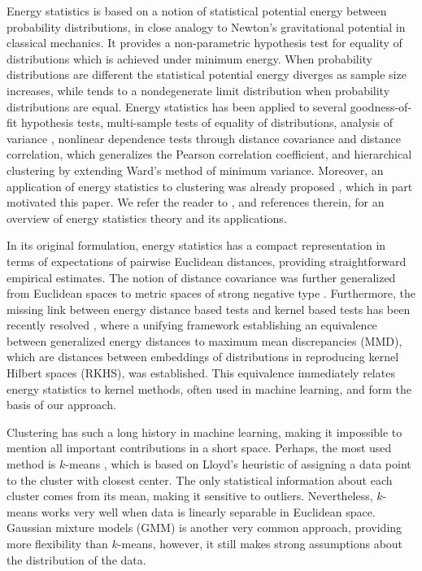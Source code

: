 \documentclass[aps,preprint,nofootinbib,floatfix]{revtex4-1}
\begin{document}
Energy statistics \cite{Szkely2013}
is based on a 
notion of statistical potential energy between probability distributions,
in close analogy to Newton's gravitational potential in classical mechanics. 
It provides a non-parametric hypothesis test for equality of 
distributions which is achieved 
under minimum energy. When probability distributions are different the 
statistical potential energy diverges as sample size increases, while tends 
to a nondegenerate limit distribution when probability
distributions are equal. 
Energy statistics has been applied to several goodness-of-fit 
hypothesis tests, multi-sample tests of equality of distributions, 
analysis of variance \cite{RizzoVariance}, nonlinear dependence tests through
distance covariance and distance correlation, which generalizes the Pearson
correlation coefficient, and hierarchical clustering \cite{RizzoClustering} 
by extending Ward's method of minimum variance. Moreover, an application of 
energy statistics to clustering was already proposed \cite{Kgroups}, 
which in part motivated this paper. We refer the reader to \cite{Szkely2013}, 
and references therein, for an overview of energy statistics theory and 
its applications.

In its original formulation, energy statistics has a compact representation
in terms of expectations of pairwise Euclidean distances, providing
straightforward empirical estimates. 
The notion of distance covariance was further generalized from Euclidean 
spaces to metric spaces of strong negative type \cite{Lyons}. Furthermore, 
the missing link between energy distance based tests and kernel 
based tests has 
been recently resolved \cite{Sejdinovic2013}, where a unifying framework
establishing an equivalence between generalized energy distances to maximum
mean discrepancies (MMD), which are distances between embeddings of 
distributions in reproducing kernel Hilbert spaces (RKHS), was established. 
This equivalence immediately relates energy statistics to
kernel methods, often used in machine learning, and form the basis 
of our approach.

Clustering has such a long history in machine learning, making it
impossible to mention all important contributions in a short space. 
Perhaps, the most used method is $k$-means \cite{Lloyd,MacQueen,Forgy}, which
is based on Lloyd's heuristic \cite{Lloyd} of assigning a data point to
the cluster with closest center. The only statistical 
information about each cluster comes from its mean, making it sensitive 
to outliers. Nevertheless, $k$-means works very well when data is 
linearly separable in Euclidean space. Gaussian mixture models (GMM) is 
another very common approach, providing more flexibility than $k$-means, 
however, it still makes strong assumptions about the distribution of 
the data.
\end{document}
